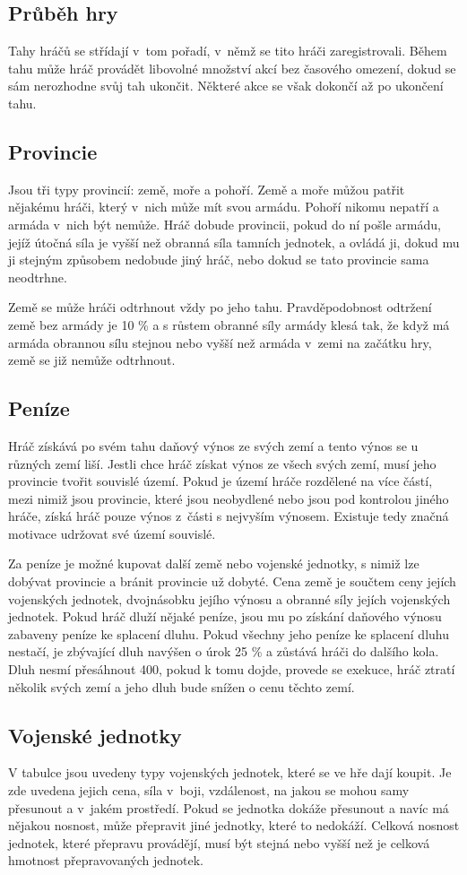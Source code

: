 \documentclass[a4paper,12pt]{article}
\begin{document}
\subsection{Průběh hry}
Tahy hráčů se střídají v~tom pořadí, v~němž se tito hráči zaregistrovali. Během tahu může hráč provádět libovolné množství akcí bez časového omezení, dokud se sám nerozhodne svůj tah ukončit. Některé akce se však dokončí až po ukončení tahu.
\subsection{Provincie}
Jsou tři typy provincií: země, moře a pohoří. Země a moře můžou patřit nějakému hráči, který v~nich může mít svou armádu. Pohoří nikomu nepatří a armáda v~nich být nemůže. Hráč dobude provincii, pokud do ní pošle armádu, jejíž útočná síla je vyšší než obranná síla tamních jednotek, a ovládá ji, dokud mu ji stejným způsobem nedobude jiný hráč, nebo dokud se tato provincie sama neodtrhne.

Země se může hráči odtrhnout vždy po jeho tahu. Pravděpodobnost odtržení země bez armády je 10 \% a s růstem obranné síly armády klesá tak, že když má armáda obrannou sílu stejnou nebo vyšší než armáda v~zemi na začátku hry, země se již nemůže odtrhnout.
\subsection{Peníze}
Hráč získává po svém tahu daňový výnos ze svých zemí a tento výnos se u různých zemí liší. Jestli chce hráč získat výnos ze všech svých zemí, musí jeho provincie tvořit souvislé území. Pokud je území hráče rozdělené na více částí, mezi nimiž jsou provincie, které jsou neobydlené nebo jsou pod kontrolou jiného hráče, získá hráč pouze výnos z~části s nejvyším výnosem. Existuje tedy značná motivace udržovat své území souvislé.

Za peníze je možné kupovat další země nebo vojenské jednotky, s nimiž lze dobývat provincie a bránit provincie už dobyté. Cena země je součtem ceny jejích vojenských jednotek, dvojnásobku jejího výnosu a obranné síly jejích vojenských jednotek. Pokud hráč dluží nějaké peníze, jsou mu po získání daňového výnosu zabaveny peníze ke splacení dluhu. Pokud všechny jeho peníze ke splacení dluhu nestačí, je zbývající dluh navýšen o úrok 25 \% a zůstává hráči do dalšího kola. Dluh nesmí přesáhnout 400, pokud k tomu dojde, provede se exekuce, hráč ztratí několik svých zemí a jeho dluh bude snížen o cenu těchto zemí.
\subsection{Vojenské jednotky}
V tabulce jsou uvedeny typy vojenských jednotek, které se ve hře dají koupit. Je zde uvedena jejich cena, síla v~boji, vzdálenost, na jakou se mohou samy přesunout a v~jakém prostředí. Pokud se jednotka dokáže přesunout a navíc má nějakou nosnost, může přepravit jiné jednotky, které to nedokáží. Celková nosnost jednotek, které přepravu provádějí, musí být stejná nebo vyšší než je celková hmotnost přepravovaných jednotek.
\end{document}
